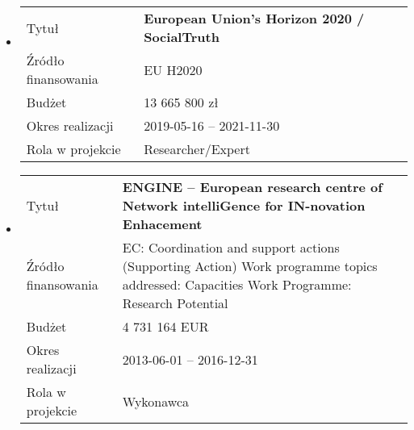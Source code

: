 \begin{itemize}
	\item[] \begin{tabular}{p{10em}|p{20em}}
Tytuł &	\textbf{European Union's Horizon 2020 / SocialTruth}\\
Źródło finansowania & EU H2020\\
Budżet & 13 665 800 zł\\
Okres realizacji & 2019-05-16 – 2021-11-30\\
Rola w projekcie & Researcher/Expert
\end{tabular}\vspace{1em}


	\item[] \begin{tabular}{p{10em}|p{20em}}
Tytuł &	\textbf{ENGINE – European research centre of Network intelliGence for IN-novation Enhacement}\\
Źródło finansowania & EC: Coordination and support actions (Supporting Action) Work programme topics addressed: Capacities Work Programme: Research Potential\\
Budżet & 4 731 164 EUR\\
Okres realizacji & 2013-06-01 – 2016-12-31\\
Rola w projekcie & Wykonawca
\end{tabular}\vspace{1em}

\end{itemize}

